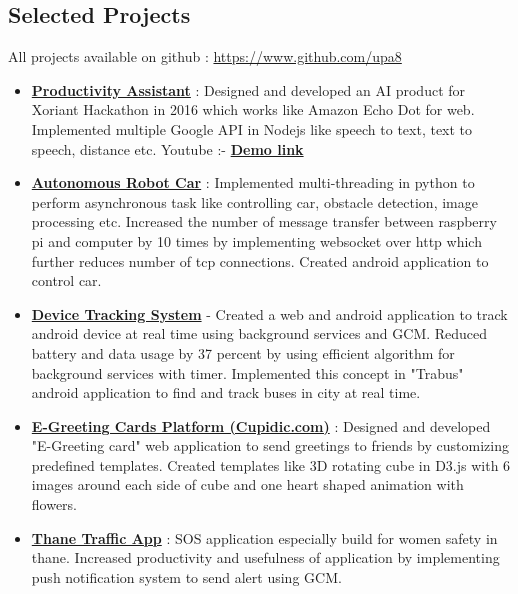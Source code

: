 \documentclass[margin, centered]{res}
\begin{document}
\begin{resume}

\section{Selected Projects}
All projects available on github : \url{https://www.github.com/upa8}
\begin{itemize}[leftmargin=*]
\item \textbf{\href{https://github.com/upa8/Productivity-Assistant}{Productivity Assistant}} : 
Designed and developed an AI product for Xoriant Hackathon in 2016 which works like Amazon Echo Dot for web. Implemented multiple Google API in Nodejs like speech to text, text to speech, distance etc. Youtube :- \textbf{\href{https://www.youtube.com/watch?v=o2ZOIj3j8zo}{Demo link}} 
\item \textbf{\href{https://github.com/upa8/Autonomous-Robot-Car}{Autonomous Robot Car}} : Implemented multi-threading in python to perform asynchronous 
task like controlling car, obstacle detection, image processing etc. Increased the number of message transfer between raspberry pi and computer by 10 times by implementing websocket over http which further reduces number of tcp connections. Created android application to control car. 
\item \textbf{\href{https://github.com/upa8/Device-Tracking-System}{Device Tracking System}} - Created a web and android application to track android device at real 
time using background services and GCM. Reduced battery and data usage by 37 percent by using efficient algorithm for background services with timer. Implemented this concept in "Trabus" android application to find and track buses in city at real time. 
 \item \textbf{\href{http://cupidic.com/}{E-Greeting Cards Platform (Cupidic.com)}} : 
Designed and developed "E-Greeting card" web application to send greetings to friends by customizing predefined templates. Created templates like 3D rotating cube in D3.js with 6 images around each side of cube and one heart shaped animation with flowers. 
\item \textbf{\href{https://github.com/upa8/Thane-Traffic-App}{Thane Traffic App}} : SOS application especially build for women safety in thane. Increased productivity 
and usefulness of application by implementing push notification system to send alert using GCM.
  

\end{itemize}
\end{resume}
\end{document}
